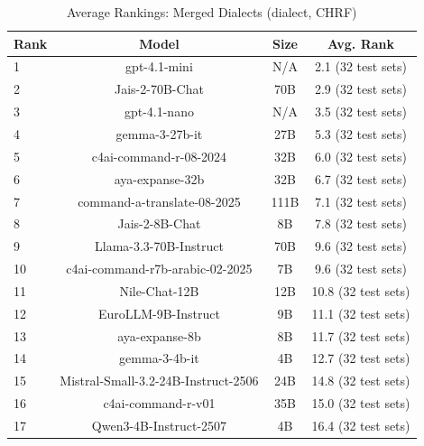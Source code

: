 \begin{table}[htbp]
\centering
\caption{Average Rankings: Merged Dialects (dialect, CHRF)}
\label{tab:avg_rankings_chrf_dialect}
\begin{tabular}{l@{\hspace{3pt}}c@{\hspace{3pt}}c@{\hspace{3pt}}c}
\toprule
Rank & Model & Size & Avg. Rank \\
\midrule
1 & gpt-4.1-mini & N/A & 2.1 (32 test sets) \\
2 & Jais-2-70B-Chat & 70B & 2.9 (32 test sets) \\
3 & gpt-4.1-nano & N/A & 3.5 (32 test sets) \\
4 & gemma-3-27b-it & 27B & 5.3 (32 test sets) \\
5 & c4ai-command-r-08-2024 & 32B & 6.0 (32 test sets) \\
6 & aya-expanse-32b & 32B & 6.7 (32 test sets) \\
7 & command-a-translate-08-2025 & 111B & 7.1 (32 test sets) \\
8 & Jais-2-8B-Chat & 8B & 7.8 (32 test sets) \\
9 & Llama-3.3-70B-Instruct & 70B & 9.6 (32 test sets) \\
10 & c4ai-command-r7b-arabic-02-2025 & 7B & 9.6 (32 test sets) \\
11 & Nile-Chat-12B & 12B & 10.8 (32 test sets) \\
12 & EuroLLM-9B-Instruct & 9B & 11.1 (32 test sets) \\
13 & aya-expanse-8b & 8B & 11.7 (32 test sets) \\
14 & gemma-3-4b-it & 4B & 12.7 (32 test sets) \\
15 & Mistral-Small-3.2-24B-Instruct-2506 & 24B & 14.8 (32 test sets) \\
16 & c4ai-command-r-v01 & 35B & 15.0 (32 test sets) \\
17 & Qwen3-4B-Instruct-2507 & 4B & 16.4 (32 test sets) \\
\bottomrule
\end{tabular}
\end{table}